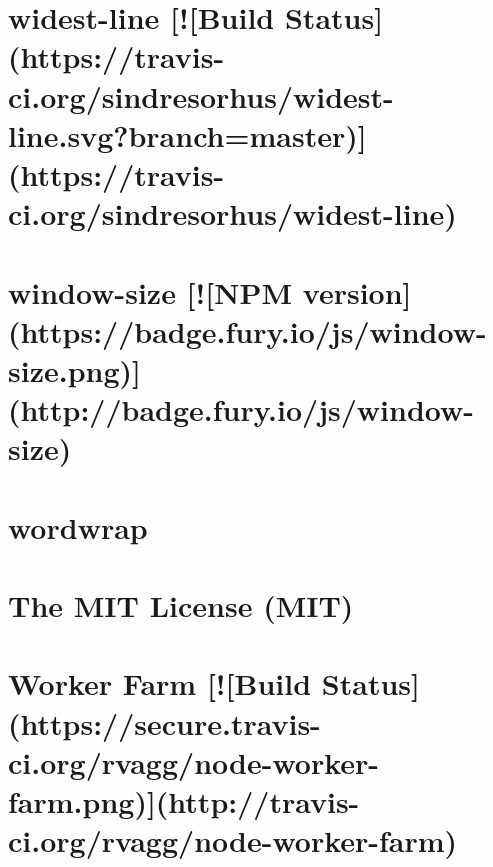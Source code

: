 \documentclass[twoside]{book}
\newcommand{\+}{\discretionary{\mbox{\scriptsize$\hookleftarrow$}}{}{}}
\begin{document}
\chapter{widest-\/line \mbox{[}!\mbox{[}Build Status\mbox{]}(https\+://travis-\/ci.org/sindresorhus/widest-\/line.svg?branch=master)\mbox{]}(https\+://travis-\/ci.org/sindresorhus/widest-\/line)}
\label{md__c_1_workspace_demo_src_main_script_node_modules_widest-line_readme}

\chapter{window-\/size \mbox{[}!\mbox{[}N\+PM version\mbox{]}(https\+://badge.fury.\+io/js/window-\/size.png)\mbox{]}(http\+://badge.fury.\+io/js/window-\/size)}
\label{md__c_1_workspace_demo_src_main_script_node_modules_window-size__r_e_a_d_m_e}

\chapter{wordwrap}
\label{md__c_1_workspace_demo_src_main_script_node_modules_wordwrap__r_e_a_d_m_e}

\chapter{The M\+IT License (M\+IT)}
\label{md__c_1_workspace_demo_src_main_script_node_modules_worker-farm__l_i_c_e_n_s_e}

\chapter{Worker Farm \mbox{[}!\mbox{[}Build Status\mbox{]}(https\+://secure.travis-\/ci.org/rvagg/node-\/worker-\/farm.png)\mbox{]}(http\+://travis-\/ci.org/rvagg/node-\/worker-\/farm)}
\label{md__c_1_workspace_demo_src_main_script_node_modules_worker-farm__r_e_a_d_m_e}

\end{document}
